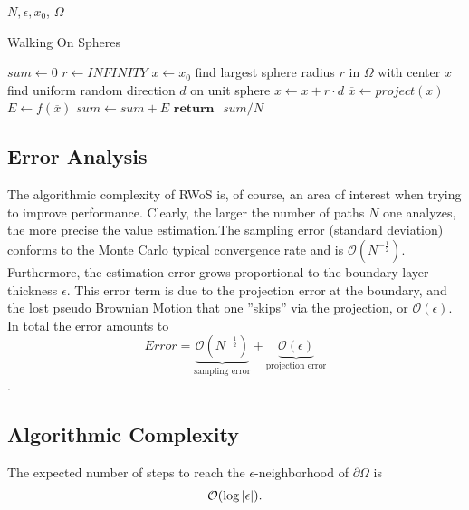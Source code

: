  \begin{algorithm}[H]{$N, \epsilon, x_{0}$, $\Omega$}
  \caption{Walking On Spheres}
 \label{alg:wos}
\begin{algorithmic}[1]
   \State $sum \gets 0$
   \label{lst:line:for}
   \State $ r \gets INFINITY$
   \State $x \leftarrow x_{0}$
      \State find largest sphere radius $r$ in $\Omega$ with center $x$ \label{lst:line:radius}
      \State find uniform random direction $d$ on unit sphere \label{lst:line:direction}
      \State $ x \gets x + r\cdot d$ 
 \EndWhile
 \State $\overline x \gets project(x)$ 
 \State $E \gets f(\overline x)$ 
 \State $sum \gets sum + E$  \label{lst:line:reduce}
  \EndFor
 \State $\textbf{return} \text{ } sum / N$ 

\end{algorithmic}
\end{algorithm}

\subsection{Error Analysis}\label{errorAnal}
The algorithmic complexity of \Gls{RWoS} is, of course, an area of interest
when trying to improve performance. Clearly, the larger the number of paths $N$ one
analyzes, the more precise the value estimation.The sampling error (standard deviation)
conforms to the Monte Carlo typical convergence rate and
is $\mathcal{O}(N^{-\frac{1}{2}})$. Furthermore, the estimation error grows proportional to
the boundary layer thickness $\epsilon$.
This error term is due to the projection error at the boundary, and the lost
pseudo Brownian Motion that one ''skips'' via the projection, or  $\mathcal{O}(\epsilon)$.
In total the error amounts to $$Error = \underbrace{ \mathcal{O}(N^{-\frac{1}{2}})}_\text{sampling error} + \underbrace{\mathcal{O}(\epsilon)}_\text{projection error}$$\cite{Bornemann}\label{errorComplexity}.

\subsection{Algorithmic Complexity}

\begin{theorem}
The expected number of steps to reach the $\epsilon$-neighborhood of $\partial\Omega$
is $$\mathcal{O}(\log{}\abs{\epsilon}).$$\cite{Bornemann,DeLaurentis}\label{epsilonComplexity}
\end{theorem}

